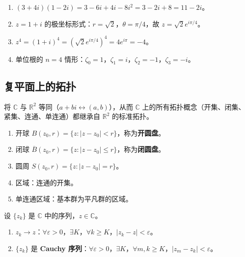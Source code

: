 \begin{example}[复数运算的实例]\label{ex:ca_complex_examples}
\begin{enumerate}[label=(\roman*)]
    \item $(3+4i)(1-2i) = 3 - 6i + 4i - 8i^2 = 3 - 2i + 8 = 11 - 2i$。
    \item $z = 1 + i$ 的极坐标形式：$r = \sqrt{2}$，$\theta = \pi/4$，故 $z = \sqrt{2} e^{i\pi/4}$。
    \item $z^4 = (1+i)^4 = (\sqrt{2} e^{i\pi/4})^4 = 4 e^{i\pi} = -4$。
    \item 单位根的 $n = 4$ 情形：$\zeta_0 = 1$，$\zeta_1 = i$，$\zeta_2 = -1$，$\zeta_3 = -i$。
\end{enumerate}
\end{example}

\subsection{复平面上的拓扑}

\begin{definition}\label{def:ca_topology}
将 $\mathbb{C}$ 与 $\mathbb{R}^2$ 等同（$a + bi \leftrightarrow (a, b)$），从而 $\mathbb{C}$ 上的所有拓扑概念（开集、闭集、紧集、连通、单连通）都继承自 $\mathbb{R}^2$ 的标准拓扑。
\begin{enumerate}[label=(\roman*)]
    \item 开球 $B(z_0, r) = \{z : |z - z_0| < r\}$，称为\textbf{开圆盘}。
    \item 闭球 $\overline{B}(z_0, r) = \{z : |z - z_0| \le r\}$，称为\textbf{闭圆盘}。
    \item 圆周 $S(z_0, r) = \{z : |z - z_0| = r\}$。
    \item 区域：连通的开集。
    \item 单连通区域：基本群为平凡群的区域。
\end{enumerate}
\end{definition}

\begin{definition}\label{def:ca_seq_convergence}
设 $\{z_k\}$ 是 $\mathbb{C}$ 中的序列，$z \in \mathbb{C}$。
\begin{enumerate}[label=(\roman*)]
    \item $z_k \to z$：$\forall \varepsilon > 0$，$\exists K$，$\forall k \ge K$，$|z_k - z| < \varepsilon$。
    \item $\{z_k\}$ 是 \textbf{Cauchy 序列}：$\forall \varepsilon > 0$，$\exists K$，$\forall m, k \ge K$，$|z_m - z_k| < \varepsilon$。
\end{enumerate}
\end{definition}

